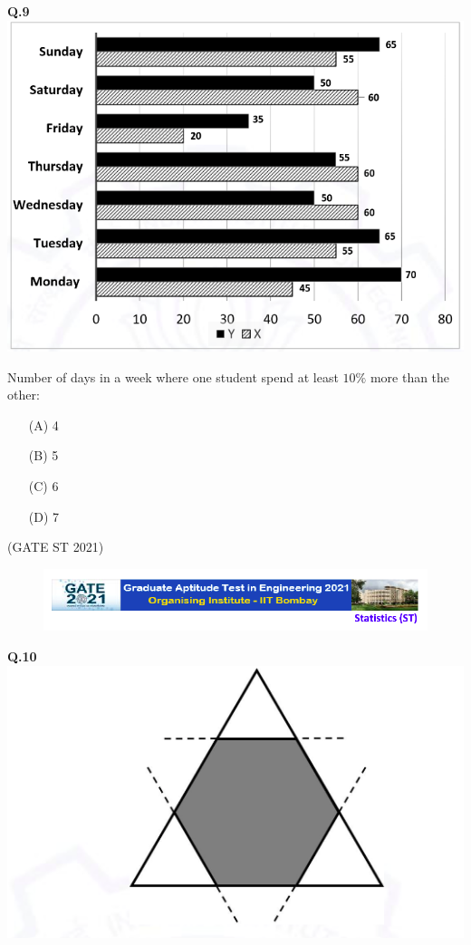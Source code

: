 \documentclass[journal,12pt,onecolumn]{IEEEtran}
\theoremstyle{remark}
\begin{document}
\textbf{Q.9} \\
   \includegraphics[width=1\linewidth]{figs/4.png} 
  
Number of days in a week where one student spend at least $10\%$ more than the other:

\begin{enumerate}
\item[(A)] 4
\item[(B)] 5
\item[(C)] 6
\item[(D)] 7
\end{enumerate}

\hfill (GATE ST 2021) \\
\newpage
\begin{figure}
 \centering
    \includegraphics[width=1\linewidth]{figs/0.png} 
\end{figure}

\textbf{Q.10} \\    \includegraphics[width=0.4\linewidth]{figs/5.png} 
\end{document}
